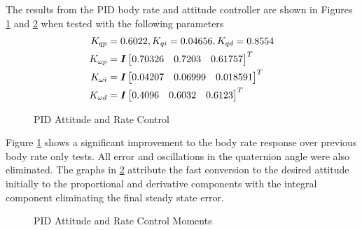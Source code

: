 The results from the PID body rate and attitude controller are shown in Figures \ref{fig:PIDAttitudeAndRateControl} and \ref{fig:PIDAttitudeAndRateControlMoments} when tested with the following parameters
\begin{equation}
  \begin{aligned}
    K_{qp} &= 0.6022,K_{qi} = 0.04656,K_{qd} = 0.8554 \\
    K_{\omega p} &= \boldsymbol{I} \begin{bmatrix} 0.70326 & 0.7203 & 0.61757 \end{bmatrix}^T \\
    K_{\omega i} &= \boldsymbol{I} \begin{bmatrix} 0.04207 & 0.06999 & 0.018591 \end{bmatrix}^T \\
    K_{\omega d} &= \boldsymbol{I} \begin{bmatrix} 0.4096 & 0.6032 & 0.6123 \end{bmatrix}^T
  \end{aligned}
\end{equation}
\begin{figure}[H]
  \centerline{}
  \caption{PID Attitude and Rate Control}
  \label{fig:PIDAttitudeAndRateControl}
\end{figure}
Figure \ref{fig:PIDAttitudeAndRateControl} shows a significant improvement to the body rate response over previous body rate only tests.  All error and oscillations in the quaternion angle were also eliminated.  The graphs in \ref{fig:PIDAttitudeAndRateControlMoments} attribute the fast conversion to the desired attitude initially to the proportional and derivative components with the integral component eliminating the final steady state error.
\begin{figure}[H]
  \centerline{}
  \caption{PID Attitude and Rate Control Moments}
  \label{fig:PIDAttitudeAndRateControlMoments}
\end{figure}

